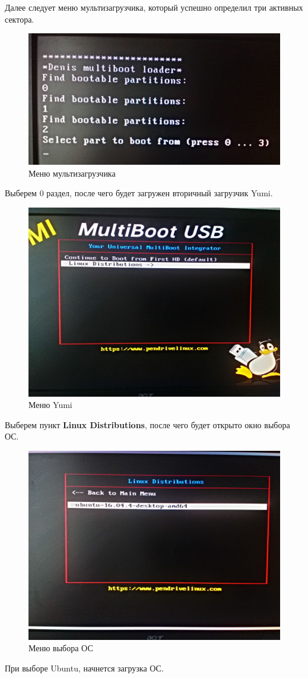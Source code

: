 Далее следует меню мультизагрузчика, который успешно определил три активных сектора.
\begin{figure}[H]
  \centering
  \includegraphics[width=.8\textwidth]{img/p3/testing/2}
  \caption{Меню мультизагрузчика}
\end{figure}
Выберем 0 раздел, после чего будет загружен вторичный загрузчик Yumi.
\begin{figure}[H]
  \centering
  \includegraphics[width=.8\textwidth]{img/p3/testing/3}
  \caption{Меню Yumi}
\end{figure}
Выберем пункт \textbf{Linux Distributions}, после чего будет открыто окно выбора ОС.
\begin{figure}[H]
  \centering
  \includegraphics[width=.8\textwidth]{img/p3/testing/4}
  \caption{Меню выбора ОС}
\end{figure}
При выборе Ubuntu, начнется загрузка ОС.

